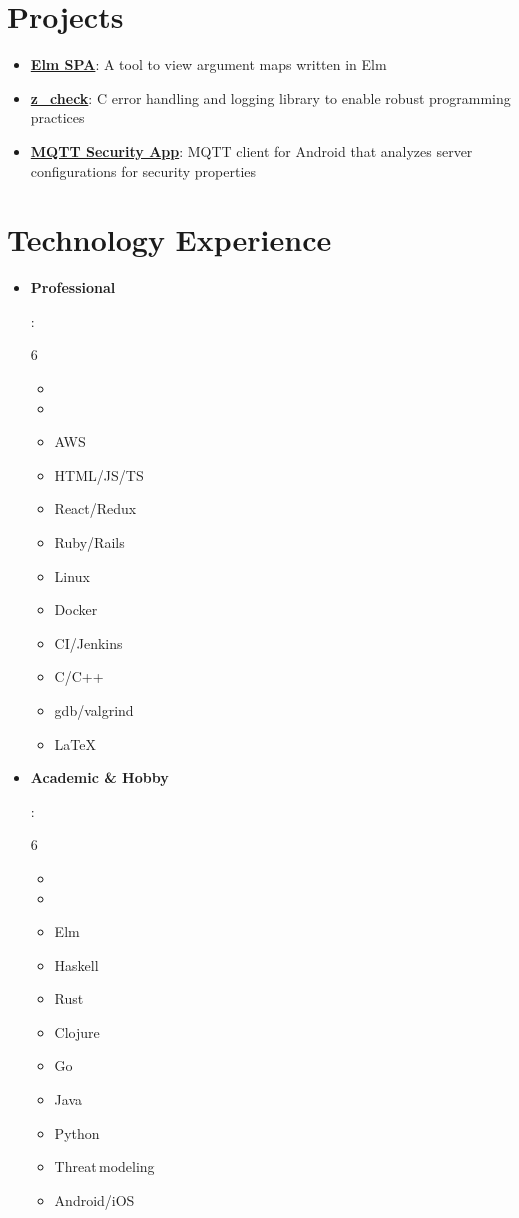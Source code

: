 \documentclass[letterpaper,11pt]{article}
\newcommand{\resumeItem}[2]{
  \item\small{
    \textbf{#1}{: #2 \vspace{-2pt}}
  }
}
\newcommand{\resumeSubItem}[2]{\resumeItem{#1}{#2}\vspace{-4pt}}
\newcommand{\resumeSubHeadingListStart}{\begin{itemize}[leftmargin=*]}
\newcommand{\resumeSubHeadingListEnd}{\end{itemize}}
\newcommand{\resumeListMulticolStart}[1]{
  \vspace{-2.4em}
  \setlength{\columnsep}{-1pc}
  \begin{multicols}{#1}
    \begin{itemize}[label={}]
      \item
}
\newcommand{\resumeListMulticolEnd}{
    \end{itemize}
  \end{multicols}
  \vspace{-10pt}
}
\begin{document}
\section{Projects}
  \resumeSubHeadingListStart
    \resumeSubItem{\href{https://kkredit.github.io/arg-viewer/}{Elm SPA}}
      {A tool to view argument maps written in Elm}
    \resumeSubItem{\href{https://github.com/kkredit/z_check}{z\_check}}
      {C error handling and logging library to enable robust programming practices}
    \resumeSubItem{\href{https://github.com/kkredit/MQTT-sweeper-android}{MQTT Security App}}
      {MQTT client for Android that analyzes server configurations for security properties}
  \resumeSubHeadingListEnd


\section{Technology Experience}
  \resumeSubHeadingListStart

  \resumeSubItem{Professional}
    {
      \resumeListMulticolStart{6}
        \item %
        \item AWS
        \item HTML/JS/TS
        \item React/Redux
        \item Ruby/Rails
        \item Linux
        \item Docker
        \item CI/Jenkins
        \item C/C++
        \item gdb/valgrind
        \item \LaTeX
      \resumeListMulticolEnd
    }
  \resumeSubItem{Academic \& Hobby}
    {
      \resumeListMulticolStart{6}
        \item %
        \item Elm
        \item Haskell
        \item Rust
        \item Clojure
        \item Go
        \item Java
        \item Python
        \item Threat\,modeling
        \item Android/iOS
      \resumeListMulticolEnd
    }
  \resumeSubHeadingListEnd
\end{document}
